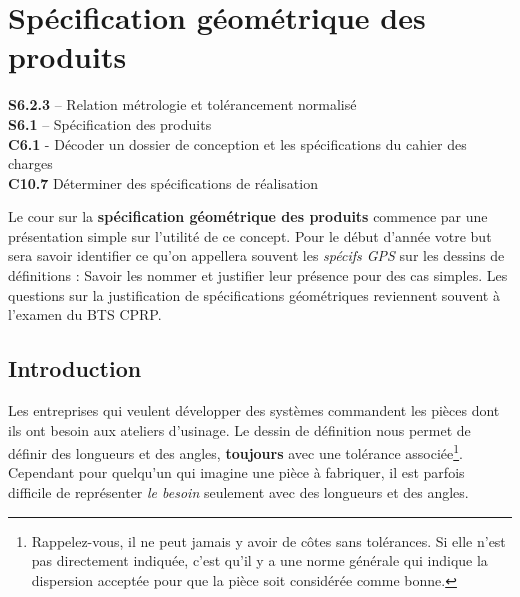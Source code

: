 \documentclass[
	11pt, %
	fleqn, %
	a4paper, %
]{LegrandOrangeBook}
\begin{document}

\chapterspaceabove{6.25cm} %
\chapterspacebelow{7.5cm} %


\chapter{Spécification géométrique des produits}

\begin{corollary}[GPS]
    \textbf{S6.2.3} – Relation métrologie et tolérancement normalisé \\
    \textbf{S6.1} – Spécification des produits \\
    \textbf{C6.1} - Décoder un dossier de conception et les spécifications du cahier des charges \\
    \textbf{C10.7} Déterminer des spécifications de réalisation \\
    
    
\end{corollary}

Le cour sur la \textbf{spécification géométrique des produits} commence par une présentation simple sur l'utilité de ce concept. Pour le début d'année votre but sera savoir identifier ce qu'on appellera souvent les \textit{spécifs GPS} sur les dessins de définitions : Savoir les nommer et justifier leur présence pour des cas simples. Les questions sur la justification de spécifications géométriques reviennent souvent à l'examen du BTS CPRP.

\section{Introduction}

Les entreprises qui veulent développer des systèmes commandent les pièces dont ils ont besoin aux ateliers d'usinage. Le dessin de définition nous permet de définir des longueurs et des angles, \textbf{toujours} avec une tolérance associée\footnote{Rappelez-vous, il ne peut jamais y avoir de côtes sans tolérances. Si elle n'est pas directement indiquée, c'est qu'il y a une norme générale qui indique la dispersion acceptée pour que la pièce soit considérée comme bonne.}. Cependant pour quelqu'un qui imagine une pièce à fabriquer, il est parfois difficile de représenter \textit{le besoin} seulement avec des longueurs et des angles.
\end{document}
